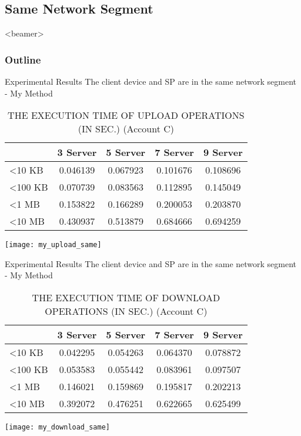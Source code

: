 \subsection{Same Network Segment}
\begin{frame}<beamer>
    \frametitle{Outline}
    \tableofcontents[currentsubsection]
\end{frame}

\begin{frame}{Experimental Results}
{The client device and SP are in the same network segment - My Method}
	\scriptsize
    \begin{table}[]
    \centering
    \caption{THE EXECUTION TIME OF \alert{UPLOAD} OPERATIONS (IN SEC.) (Account C)}
    \begin{tabular}{lcccc}
                         & 3 Server & 5 Server & 7 Server & 9 Server \\ \hline
        \textless 10 KB  & 0.046139 & 0.067923 & 0.101676 & 0.108696 \\ \hline
        \textless 100 KB & 0.070739 & 0.083563 & 0.112895 & 0.145049 \\ \hline
        \textless 1 MB   & 0.153822 & 0.166289 & 0.200053 & 0.203870 \\ \hline
        \textless 10 MB  & 0.430937 & 0.513879 & 0.684666 & 0.694259 \\ \hline
    \end{tabular}
    \end{table}
    \begin{center}
		\texttt{[image: my\_upload\_same]}
    \end{center}
\end{frame}

\begin{frame}{Experimental Results}
{The client device and SP are in the same network segment - My Method}
	\scriptsize
    \begin{table}[]
    \centering
    \caption{THE EXECUTION TIME OF \alert{DOWNLOAD} OPERATIONS (IN SEC.) (Account C)}
    \begin{tabular}{lcccc}
                         & 3 Server & 5 Server & 7 Server & 9 Server \\ \hline
        \textless 10 KB  & 0.042295 & 0.054263 & 0.064370 & 0.078872 \\ \hline
        \textless 100 KB & 0.053583 & 0.055442 & 0.083961 & 0.097507 \\ \hline
        \textless 1 MB   & 0.146021 & 0.159869 & 0.195817 & 0.202213 \\ \hline
        \textless 10 MB  & 0.392072 & 0.476251 & 0.622665 & 0.625499 \\ \hline
    \end{tabular}
    \end{table}
    \begin{center}
		\texttt{[image: my\_download\_same]}
    \end{center}
\end{frame}

